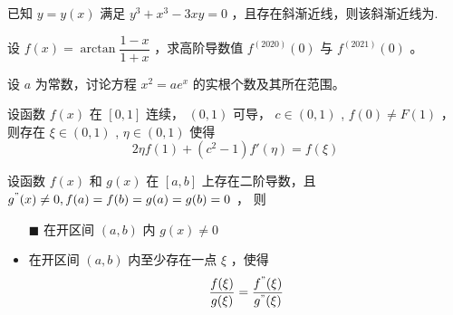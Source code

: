 \begin{quest}[C2T11]
    已知 $ y = y(x) $ 满足 $ y^3+x^3-3xy = 0 $ ，且存在斜渐近线，则该斜渐近线为\qline.
\end{quest}

\begin{quest}[C2T17]
    设 $ f(x) = \arctan \dfrac{1-x}{1+x} $ ，求高阶导数值 $ f^{(2020)}(0) $ 与 $ f^{(2021)}(0) $ 。
\end{quest}

\begin{quest}[C2T20]
    设 $ a $ 为常数，讨论方程 $ x^2=ae^x $ 的实根个数及其所在范围。
\end{quest}


\begin{quest}[C2T21]
    设函数 $ f(x) $ 在 $ [0,1] $ 连续， $ (0,1) $ 可导， $ c\in (0,1) $ , $ f(0)\neq F(1) $ ，
    则存在 $ \xi\in (0,1) $ , $ \eta\in (0,1) $ 使得 $$
        2\eta f(1) + (c^2-1)f'(\eta) = f(\xi)
    $$ 
\end{quest}

\begin{quest}[C2T22]
    设函数 $ f(x) $ 和 $ g(x) $ 在 $ [a,b] $ 上存在二阶导数，且 $ g^"(x)\neq 0, f(a)=f(b)=g(a)=g(b) = 0 $ ，
    则\begin{itemize}
        \item[$ \blacksquare $ ] 在开区间 $ (a,b) $ 内 $ g(x)\neq 0 $ 
        \item 在开区间 $ (a,b) $ 内至少存在一点 $ \xi $ ，使得$$
            \dfrac{f(\xi)}{g(\xi)} = \dfrac{f^"(\xi)}{g^"(\xi)}
        $$ 
    \end{itemize}
\end{quest}

